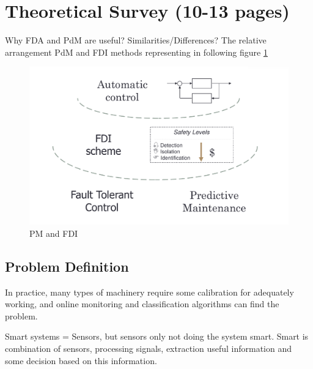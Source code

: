 \documentclass[class=article, crop=false]{standalone}
\begin{document}
\tableofcontents

% 
\section{Theoretical Survey (10-13 pages)}
Why FDA and PdM are useful? Similarities/Differences?
The relative arrangement PdM and FDI methods representing in following
figure \ref{fig:fdi_pm}
\begin{figure}[h!]
    \centering
    \includegraphics[scale=0.3]{FDI_PM.png}
    \caption{PM and FDI }
    \label{fig:fdi_pm}
\end{figure}



% 

\subsection{Problem Definition}

In practice, many types of machinery require some calibration for adequately working,
and online monitoring and classification algorithms can find the problem.



Smart systems = Sensors, but sensors only not doing the system smart. Smart
is combination of sensors, processing signals, extraction useful information and
some decision based on this information.
\end{document}

